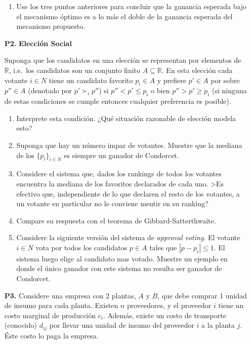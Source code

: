 \documentclass[11pt, spanish]{article}
\theoremstyle{plain}
\newcommand{\R}{\mathds{R}}
\begin{document}
\begin{itemize}
\begin{enumerate}
    \item Use los tres puntos anteriores para concluir que la ganancia esperada bajo el mecanismo
    óptimo es a lo más el doble de la ganancia esperada
    del mecanismo
    propuesto.
\end{enumerate}


  \item[\textbf{P2.}] {\bf Elección Social}
  
Suponga que los candidatos en una elecci\'on se representan por
elementos de $\R$, i.e.\ los candidatos son un conjunto finito $A
\subseteq \R$. En esta elecci\'on cada votante $i\in N$ tiene un
candidato favorito $p_i\in A$ y prefiere $p'\in A$ por sobre $p''\in
A$ (denotado por $p' \succ_i p''$) si $p''<p'\le p_i$ o bien
$p''>p'\ge p_i$ (si ninguna de estas condiciones se cumple entonces
cualquier preferencia es posible).

\begin{enumerate}
\item Interprete esta condición. ¿Qué situación razonable de elección
modela esto?
\item Suponga que hay un número impar de votantes. Muestre que la
mediana de los $\{p_i\}_{i \in {N}}$ es siempre un ganador de
Condorcet.
\item Considere el sistema que, dados los rankings de todos los
votantes encuentra la mediana de los favoritos declarados de cada uno.
>Es efectivo que, independiente de lo que declaren el resto de los
votantes, a un votante en particular no le conviene mentir en su
ranking?
\item Compare su respuesta con el teorema de Gibbard-Satterthwaite.
\item Considere la siguiente versión del sistema de \emph{approval
voting}. El votante $i\in N$ vota por todos los candidatos $p\in A$
tales que $|{p-p_i}| \le 1$. El sistema luego elige al candidato mas
votado. Muestre un ejemplo en donde el \'unico ganador con este
sistema no resulta ser ganador de Condorcet.
\end{enumerate}

  \item[\textbf{P3.}] Considere una empresa con 2 plantas, $A$ y $B$,
que debe comprar 1 unidad de insumo para cada planta. Existen $n$
proveedores, y el proveedor $i$ tiene un costo marginal de
producci\'on $c_i$. Adem\'as, existe un costo de transporte (conocido)
$d_{ij}$ por llevar una unidad de insumo del  proveedor $i$ a la
planta $j$. \'Este costo lo paga la empresa.



\end{itemize}
\end{document}
